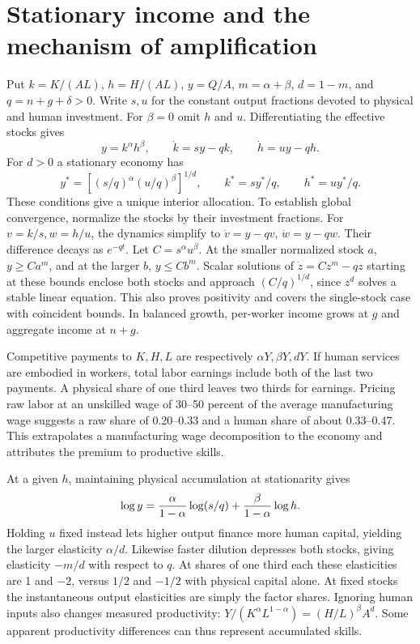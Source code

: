 \documentclass[11pt]{article}
\begin{document}
\section{Stationary income and the mechanism of amplification}
Put $k=K/(AL)$, $h=H/(AL)$, $y=Q/A$, $m=\alpha+\beta$, $d=1-m$, and $q=n+g+\delta>0$. Write $s,u$ for the constant output fractions devoted to physical and human investment. For $\beta=0$ omit $h$ and $u$. Differentiating the effective stocks gives
\[
 y=k^\alpha h^\beta,\qquad \dot k=sy-qk,\qquad \dot h=uy-qh .
\]
For $d>0$ a stationary economy has
\[
 y^*=\left[(s/q)^\alpha(u/q)^\beta\right]^{1/d},
 \qquad k^*=sy^*/q,\qquad h^*=uy^*/q.
\]
These conditions give a unique interior allocation. To establish global convergence, normalize the stocks by their investment fractions. For $v=k/s,w=h/u$, the dynamics simplify to $\dot v=y-qv$, $\dot w=y-qw$. Their difference decays as $e^{-qt}$. Let $C=s^\alpha u^\beta$. At the smaller normalized stock $a$, $y\ge C a^m$, and at the larger $b$, $y\le C b^m$. Scalar solutions of $\dot z=Cz^m-qz$ starting at these bounds enclose both stocks and approach $(C/q)^{1/d}$, since $z^d$ solves a stable linear equation. This also proves positivity and covers the single-stock case with coincident bounds. In balanced growth, per-worker income grows at $g$ and aggregate income at $n+g$.

Competitive payments to $K,H,L$ are respectively $\alpha Y,\beta Y,dY$. If human services are embodied in workers, total labor earnings include both of the last two payments. A physical share of one third leaves two thirds for earnings. Pricing raw labor at an unskilled wage of 30--50 percent of the average manufacturing wage suggests a raw share of 0.20--0.33 and a human share of about 0.33--0.47. This extrapolates a manufacturing wage decomposition to the economy and attributes the premium to productive skills.

At a given $h$, maintaining physical accumulation at stationarity gives
\[
 \log y={\alpha\over1-\alpha}\log(s/q)+{\beta\over1-\alpha}\log h .
\]
Holding $u$ fixed instead lets higher output finance more human capital, yielding the larger elasticity $\alpha/d$. Likewise faster dilution depresses both stocks, giving elasticity $-m/d$ with respect to $q$. At shares of one third each these elasticities are 1 and $-2$, versus $1/2$ and $-1/2$ with physical capital alone. At fixed stocks the instantaneous output elasticities are simply the factor shares. Ignoring human inputs also changes measured productivity: $Y/(K^\alpha L^{1-\alpha})=(H/L)^\beta A^d$. Some apparent productivity differences can thus represent accumulated skills.
\end{document}
